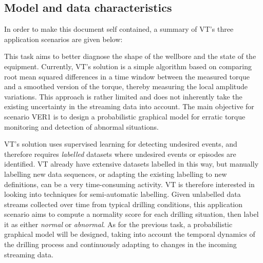 \subsection{Model and data characteristics}
In order to make this document self contained, a summary of  VT's three application  scenarios are given below:

\bde
\item[Detection of drill string vibrations:] This task aims to better diagnose the shape of the wellbore and the
state of the equipment. Currently,  VT's solution is a simple algorithm
based on comparing root mean squared differences in a time window between the
measured torque and a smoothed version of the torque, thereby measuring the local amplitude variations. 
This approach is rather limited and does not inherently take the
existing uncertainty in the streaming data  into account. The main objective for scenario VER1
is to design a probabilistic graphical model for erratic torque monitoring and
detection of abnormal situations.

\item[Semi-automatic labelling:] 
VT's solution uses supervised learning for detecting undesired events, and therefore requires \textit{labelled} datasets where undesired events or episodes are identified. 
VT already have extensive datasets labelled in this way, 
but manually labelling new data sequences, or adapting the existing labelling to
new definitions, can be a very time-consuming activity. 
VT is therefore interested in looking into techniques for semi-automatic labelling. 
Given unlabelled data streams collected over time from typical drilling conditions,
this application scenario aims to compute a normality score for each 
drilling situation, then label it as either \emph{normal} or \emph{abnormal}. As for the
previous task, a probabilistic graphical model will be designed, taking into account
the temporal dynamics of the drilling process and continuously adapting to changes
in the incoming streaming data.

